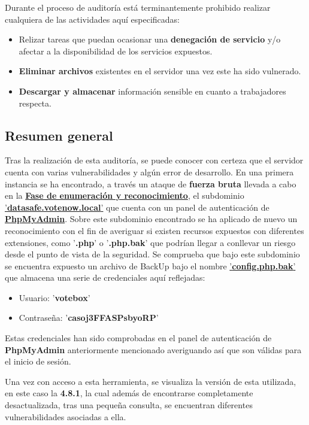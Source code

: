 \documentclass[a4paper]{article} %
\begin{document}
  Durante el proceso de auditoría está terminantemente prohibido realizar cualquiera de las actividades aquí especificadas:

  \begin{itemize}
    \item Relizar tareas que puedan ocasionar una \textbf{denegación de servicio} y/o afectar a la disponibilidad de los servicios expuestos.
    \item \textbf{Eliminar archivos} existentes en el servidor una vez este ha sido vulnerado.
    \item \textbf{Descargar y almacenar} información sensible en cuanto a trabajadores respecta.
  \end{itemize}


  \subsection{Resumen general}
    Tras la realización de esta auditoría, se puede conocer con certeza que el servidor cuenta con varias vulnerabilidades y algún error de desarrollo.
    En una primera instancia se ha encontrado, a través un ataque de \textbf{fuerza bruta} llevada a cabo en la \hyperref[sec:reconocimiento]{\textbf{Fase de enumeración y reconocimiento}}, el subdominio \hyperref[sec:subdomains]{'\textbf{datasafe.votenow.local}'} que cuenta con un panel de autenticación de \hyperref[sec:phpmyadmin]{\textbf{PhpMyAdmin}}. Sobre este subdominio encontrado se ha aplicado de nuevo un reconocimiento con el fin de averiguar si existen recursos expuestos con diferentes extensiones, como '\textbf{.php}' o '\textbf{.php.bak}' que podrían llegar a conllevar un riesgo desde el punto de vista de la seguridad. Se comprueba que bajo este subdominio se encuentra expuesto un archivo de BackUp bajo el nombre \hyperref[sec:backup]{'\textbf{config.php.bak}'} que almacena una serie de credenciales aquí reflejadas:
    \begin{itemize}
      \item Usuario: '\textbf{votebox}'
      \item Contraseña: '\textbf{casoj3FFASPsbyoRP}'
    \end{itemize}
    Estas credenciales han sido comprobadas en el panel de autenticación de \textbf{PhpMyAdmin} anteriormente mencionado averiguando así que son válidas para el inicio de sesión.

    Una vez con acceso a esta herramienta, se visualiza la versión de esta utilizada, en este caso la \textbf{4.8.1}, la cual además de encontrarse completamente desactualizada, tras una pequeña consulta, se encuentran diferentes vulnerabilidades asociadas a ella.
\end{document}
